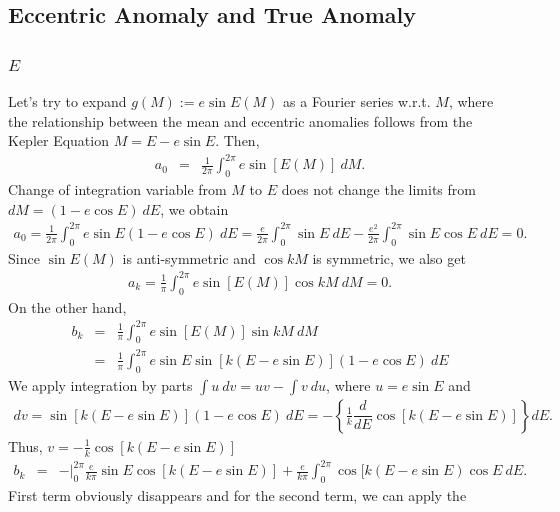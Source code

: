 \documentclass [12pt, a4paper] {article}
\newcommand{\diff}[2]
{
	\dfrac{d #1}{d #2}
}
\begin{document}
\subsection{Eccentric Anomaly and True Anomaly}
\subsubsection{$E$}
Let's try to expand $g(M) := e\sin E(M)$ as a Fourier series w.r.t. $M$, where 
the relationship between the mean and eccentric anomalies follows from the Kepler 
Equation $M = E - e\sin E$. Then, 
\begin {eqnarray}
    a_0 
    &=&
    \frac{1}{2\pi}\int_0^{2\pi} e\sin[E(M)]\:dM.
\end {eqnarray}
Change of integration variable from $M$ to $E$ does not change the limits from 
$dM = (1 - e\cos E)\:dE$, we obtain 
\begin {eqnarray}
    a_0 
    =
    \frac{1}{2\pi}\int_0^{2\pi} e\sin E(1 - e\cos E)\:dE 
    =
    \frac{e}{2\pi}\int_0^{2\pi} \sin E\:dE 
    -
    \frac{e^2}{2\pi}\int_0^{2\pi} \sin E\cos E\:dE 
    = 0.
\end {eqnarray}
Since $\sin E(M)$ is anti-symmetric and $\cos kM$ is symmetric, we also get
\begin {eqnarray}
    a_k
    =
    \frac{1}{\pi}\int_0^{2\pi} e\sin \left[E(M)\right]\cos kM\:dM 
    = 0.
\end {eqnarray}
On the other hand, 
\begin {eqnarray}
    b_k 
    &=&
    \frac{1}{\pi}\int_0^{2\pi} e\sin [E(M)]\sin kM\:dM 
    \\
    &=& 
    \frac{1}{\pi}\int_0^{2\pi} e\sin E\sin \left[k(E - e\sin E)\right](1 - e\cos E)\:dE
\end {eqnarray}
We apply integration by parts $\int u\:dv = uv - \int v\:du$, where $u= e\sin E$ and 
\begin {eqnarray}
    dv 
    =
    \sin[k(E - e\sin E)](1 - e\cos E)\: dE
    = 
    -\left\{\frac{1}{k}\diff{}{E}\cos[k(E - e\sin E)]\right\}dE.
\end {eqnarray}
Thus, $v=-\frac{1}{k}\cos[k(E - e\sin E)]$
\begin {eqnarray}
    b_k 
    &=&
    -\Big|_0^{2\pi}\frac{e}{k\pi}\sin E\cos[k(E - e\sin E)]
    +
    \frac{e}{k\pi}\int_0^{2\pi}\cos[k(E - e\sin E)\cos E\:dE.
\end {eqnarray}
First term obviously disappears and for the second term, we can apply the 
\end{document}
